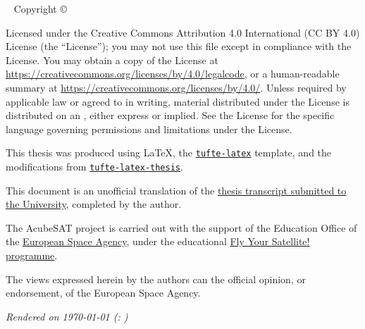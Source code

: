 \documentclass[a4paper,nobib]{tufte-book}
\begin{document}
\makeatother
\maketitle

\newpage
\begin{fullwidth}
~\vfill
\thispagestyle{empty}
\setlength{\parindent}{0pt}
\setlength{\parskip}{\baselineskip}
Copyright \copyright\ \the\year\ \thanklessauthor

\par{}

\par{}

\justify

\par Licensed under the Creative Commons Attribution 4.0 International (CC BY 4.0) License (the ``License''); you may not
use this file except in compliance with the License. You may obtain a copy
of the License at \url{https://creativecommons.org/licenses/by/4.0/legalcode}, or a human-readable summary at \url{https://creativecommons.org/licenses/by/4.0/}.
Unless
required by applicable law or agreed to in writing, material distributed
under the License is distributed on an , either express or implied. See the
License for the specific language governing permissions and limitations
under the License.

\par This thesis was produced using \LaTeX, the \href{https://ctan.org/pkg/tufte-latex?lang=en}{\texttt{tufte-latex}} template, and the modifications from \linebreak[4] \href{https://github.com/lalider/tufte-latex-thesis}{\texttt{tufte-latex-thesis}}.

\par This document is an unofficial translation of the \href{https://ikee.lib.auth.gr/record/332377/?ln=en}{thesis transcript submitted to the University}, completed by the author.

\par The AcubeSAT project is carried out with the support of the Education Office of the \href{https://www.esa.int/}{European Space Agency}, under the educational \href{https://www.esa.int/Education/CubeSats_-_Fly_Your_Satellite/}{Fly Your Satellite! programme}.

\par The views expressed herein by the authors can  the official opinion, or endorsement, of the European Space Agency.

\par\textit{Rendered on \today{} (\texttt{\gitcommit}: \gitcommitmessage)}
\end{fullwidth}
\end{document}
